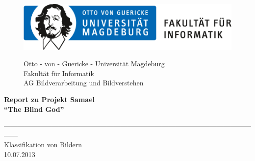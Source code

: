 \documentclass[liststotoc,11pt,a4paper]{article}
\begin{document}
\begin{figure}[htbp]
\begin{minipage}[t]{5cm}
\vspace{0pt}
\includegraphics{ovgu_logo_fak_inf}
\end{minipage}
\hfill
\begin{minipage}[t]{8cm}
\vspace{0pt}
\begin{flushright}     
Otto - von - Guericke - Universität Magdeburg\\Fakultät für Informatik\\AG Bildverarbeitung und Bildverstehen\\
\end{flushright}
\end{minipage}
\end{figure}
\vspace{50pt}

\begin{center}
\huge\bfseries Report zu Projekt Samael\\
\vspace{10pt}
\large"`The Blind God"'\\
\end{center}
\begin{center}
\vspace{20pt}
------------------------------------------------------------------------------------------------------------------\\[30pt]
\large Klassifikation von Bildern\\
\vspace{10pt}
\normalsize 10.07.2013 \\[220pt] 
\end {center}
\end{document}
